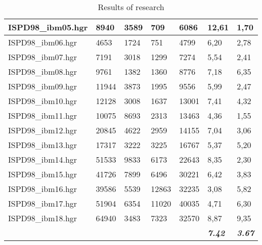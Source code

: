 \documentclass[12pt,a4paper,twocolumn]{article}
\begin{document}
\begin{table*}[tb]
\begin{tabular}{|lllll|l|l|}
	\multicolumn{1}{|l|}{ISPD98\_ibm05.hgr} &
	\multicolumn{1}{l|}{8940} &
	\multicolumn{1}{l|}{3589} &
	\multicolumn{1}{l|}{709} &
	6086 &
	12,61 &
	1,70 \\ \hline
	\multicolumn{1}{|l|}{ISPD98\_ibm06.hgr} &
	\multicolumn{1}{l|}{4653} &
	\multicolumn{1}{l|}{1724} &
	\multicolumn{1}{l|}{751} &
	4799 &
	6,20 &
	2,78 \\ \hline
	\multicolumn{1}{|l|}{ISPD98\_ibm07.hgr} &
	\multicolumn{1}{l|}{7191} &
	\multicolumn{1}{l|}{3018} &
	\multicolumn{1}{l|}{1299} &
	7274 &
	5,54 &
	2,41 \\ \hline
	\multicolumn{1}{|l|}{ISPD98\_ibm08.hgr} &
	\multicolumn{1}{l|}{9761} &
	\multicolumn{1}{l|}{1382} &
	\multicolumn{1}{l|}{1360} &
	8776 &
	7,18 &
	6,35 \\ \hline
	\multicolumn{1}{|l|}{ISPD98\_ibm09.hgr} &
	\multicolumn{1}{l|}{11944} &
	\multicolumn{1}{l|}{3873} &
	\multicolumn{1}{l|}{1995} &
	9556 &
	5,99 &
	2,47 \\ \hline
	\multicolumn{1}{|l|}{ISPD98\_ibm10.hgr} &
	\multicolumn{1}{l|}{12128} &
	\multicolumn{1}{l|}{3008} &
	\multicolumn{1}{l|}{1637} &
	13001 &
	7,41 &
	4,32 \\ \hline
	\multicolumn{1}{|l|}{ISPD98\_ibm11.hgr} &
	\multicolumn{1}{l|}{10075} &
	\multicolumn{1}{l|}{8693} &
	\multicolumn{1}{l|}{2313} &
	13463 &
	4,36 &
	1,55 \\ \hline
	\multicolumn{1}{|l|}{ISPD98\_ibm12.hgr} &
	\multicolumn{1}{l|}{20845} &
	\multicolumn{1}{l|}{4622} &
	\multicolumn{1}{l|}{2959} &
	14155 &
	7,04 &
	3,06 \\ \hline
	\multicolumn{1}{|l|}{ISPD98\_ibm13.hgr} &
	\multicolumn{1}{l|}{17317} &
	\multicolumn{1}{l|}{3222} &
	\multicolumn{1}{l|}{3225} &
	16767 &
	5,37 &
	5,20 \\ \hline
	\multicolumn{1}{|l|}{ISPD98\_ibm14.hgr} &
	\multicolumn{1}{l|}{51533} &
	\multicolumn{1}{l|}{9833} &
	\multicolumn{1}{l|}{6173} &
	22643 &
	8,35 &
	2,30 \\ \hline
	\multicolumn{1}{|l|}{ISPD98\_ibm15.hgr} &
	\multicolumn{1}{l|}{41726} &
	\multicolumn{1}{l|}{7899} &
	\multicolumn{1}{l|}{6496} &
	30221 &
	6,42 &
	3,83 \\ \hline
	\multicolumn{1}{|l|}{ISPD98\_ibm16.hgr} &
	\multicolumn{1}{l|}{39586} &
	\multicolumn{1}{l|}{5539} &
	\multicolumn{1}{l|}{12863} &
	32235 &
	3,08 &
	5,82 \\ \hline
	\multicolumn{1}{|l|}{ISPD98\_ibm17.hgr} &
	\multicolumn{1}{l|}{51904} &
	\multicolumn{1}{l|}{6354} &
	\multicolumn{1}{l|}{11020} &
	40035 &
	4,71 &
	6,30 \\ \hline
	\multicolumn{1}{|l|}{ISPD98\_ibm18.hgr} &
	\multicolumn{1}{l|}{64940} &
	\multicolumn{1}{l|}{3483} &
	\multicolumn{1}{l|}{7323} &
	32570 &
	8,87 &
	9,35 \\ \hline
	\multicolumn{5}{|l|}{} &
	\textit{\textbf{7.42}} &
	\textit{\textbf{3.67}} \\ \hline
\end{tabular}
		\caption{Results of research}
		\label{tab:res}
		\twocolumn
	\end{table*}
\end{document}
